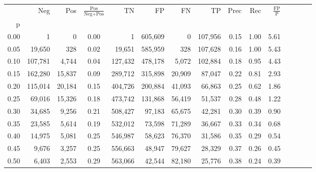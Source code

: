 \begin{tabular}{rrrcrrrrrrrrrrr}
\toprule
{} &      Neg &     Pos & $\frac{\text{Pos}}{\text{Neg}+\text{Pos}}$ &       TN &       FP &       FN &       TP &  Prec &   Rec & $\frac{\text{FP}}{\text{P}}$ \\
p    &          &         &                                            &          &          &          &          &       &       &                              \\
\midrule
0.00 &        1 &       0 &                                       0.00 &        1 &  605,609 &        0 &  107,956 &  0.15 &  1.00 &                         5.61 \\
0.05 &   19,650 &     328 &                                       0.02 &   19,651 &  585,959 &      328 &  107,628 &  0.16 &  1.00 &                         5.43 \\
0.10 &  107,781 &   4,744 &                                       0.04 &  127,432 &  478,178 &    5,072 &  102,884 &  0.18 &  0.95 &                         4.43 \\
0.15 &  162,280 &  15,837 &                                       0.09 &  289,712 &  315,898 &   20,909 &   87,047 &  0.22 &  0.81 &                         2.93 \\
0.20 &  115,014 &  20,184 &                                       0.15 &  404,726 &  200,884 &   41,093 &   66,863 &  0.25 &  0.62 &                         1.86 \\
0.25 &   69,016 &  15,326 &                                       0.18 &  473,742 &  131,868 &   56,419 &   51,537 &  0.28 &  0.48 &                         1.22 \\
0.30 &   34,685 &   9,256 &                                       0.21 &  508,427 &   97,183 &   65,675 &   42,281 &  0.30 &  0.39 &                         0.90 \\
0.35 &   23,585 &   5,614 &                                       0.19 &  532,012 &   73,598 &   71,289 &   36,667 &  0.33 &  0.34 &                         0.68 \\
0.40 &   14,975 &   5,081 &                                       0.25 &  546,987 &   58,623 &   76,370 &   31,586 &  0.35 &  0.29 &                         0.54 \\
0.45 &    9,676 &   3,257 &                                       0.25 &  556,663 &   48,947 &   79,627 &   28,329 &  0.37 &  0.26 &                         0.45 \\
0.50 &    6,403 &   2,553 &                                       0.29 &  563,066 &   42,544 &   82,180 &   25,776 &  0.38 &  0.24 &                         0.39 \\

\end{tabular}
